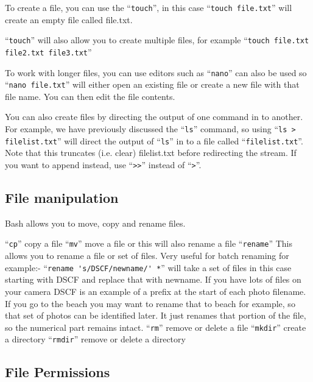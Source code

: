 \documentclass{extbook}
\begin{document}
To create a file, you can use the ``\verb|touch|'', in this case ``\verb|touch file.txt|'' will create an empty file called file.txt.

``\verb|touch|'' will also allow you to create multiple files, for example ``\verb|touch file.txt file2.txt file3.txt|''

To work with longer files, you can use editors such as ``\verb|nano|'' can also be used so ``\verb|nano file.txt|'' will either open an existing file or create a new file with that file name. You can then edit the file contents.

You can also create files by directing the output of one command in to another. For example, we have previously discussed the ``\verb|ls|'' command, so using ``\verb|ls > filelist.txt|'' will direct the output of ``\verb|ls|'' in to a file called ``\verb|filelist.txt|''. Note that this truncates (i.e. clear) filelist.txt before redirecting the stream. If you want to append instead, use ``\verb|>>|'' instead of ``\verb|>|''.


\subsection{File manipulation}

Bash allows you to move, copy and rename files.

``\verb|cp|'' copy a file
``\verb|mv|'' move a file or this will also rename a file
``\verb|rename|'' This allows you to rename a file or set of files. Very useful for batch renaming for example:-
``\verb|rename 's/DSCF/newname/' *|'' will take a set of files in this case starting with DSCF and replace that with newname. If you have lots of files on your camera DSCF is an example of a prefix at the start of each photo filename. If you go to the beach you may want to rename that to beach for example, so that set of photos can be identified later. It just renames that portion of the file, so the numerical part remains intact.
``\verb|rm|'' remove or delete a file
``\verb|mkdir|'' create a directory
``\verb|rmdir|'' remove or delete a directory

\subsection{File Permissions}
\end{document}
